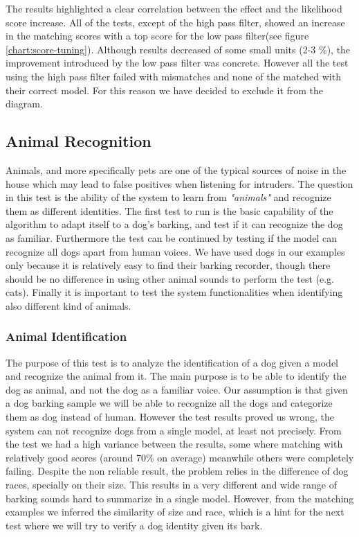 The results highlighted a clear correlation between the effect and the likelihood score
increase. All of the tests, except of the high pass filter, showed an increase in the
matching scores with a top score for the low pass filter(see figure \ref{chart:score-tuning}).
Although results decreased of some small units (2-3 \%), the improvement introduced by the
low pass filter was concrete. However all the test using the high pass filter failed with mismatches
and none of the matched with their correct model. For this reason we have decided to exclude it from
the diagram.


\subsection{Animal Recognition}

Animals, and more specifically pets are one of the typical sources of noise in the house
which may lead to false positives when listening for intruders. The question in this test
is the ability of the system to learn from \textit{"animals"} and recognize them as different identities.
The first test to run is the basic capability of the algorithm to adapt itself to a dog's barking,
and test if it can recognize the dog as familiar. Furthermore the test can be continued by testing
if the model can recognize all dogs apart from human voices. We have used dogs in our examples
only because it is relatively easy to find their barking recorder, though there should be no
difference in using other animal sounds to perform the test (e.g. cats).
Finally it is important to test
the system functionalities when identifying also different kind of animals.

\subsubsection{Animal Identification}

The purpose of this test is to analyze the identification of a dog given a model
and recognize the animal from it. The main purpose is to be able to identify
the dog as animal, and not the dog as a familiar voice. Our assumption is that
given a dog barking sample we will be able to recognize all the dogs and categorize
them as dog instead of human. \newline
However the test results proved us wrong, the system can not recognize dogs from a single
model, at least not precisely. From the test we had a high variance between the results, some
where matching with relatively good scores (around 70\% on average) meanwhile others
were completely failing. Despite the non reliable result, the problem relies in the
difference of dog races, specially on their size. This results in a very different
and wide range of barking sounds hard to summarize in a single model. However, from
the matching examples we inferred the similarity of size and race, which is a hint for
the next test where we will try to verify a dog identity given its bark.

